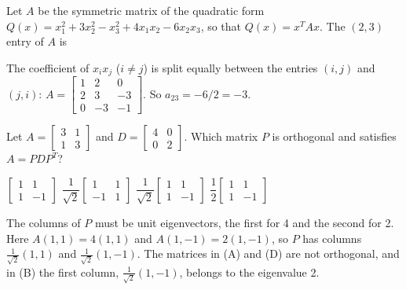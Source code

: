 \begin{question}[id=sym-10]
Let $A$ be the symmetric matrix of the quadratic form $Q(x) = x_1^2 + 3x_2^2 - x_3^2 + 4x_1x_2 - 6x_2x_3$, so that $Q(x) = x^TAx$. The $(2, 3)$ entry of $A$ is
\begin{solution}
The coefficient of $x_ix_j$ ($i \ne j$) is split equally between the entries $(i, j)$ and $(j, i)$: $A = \begin{bmatrix} 1 & 2 & 0 \\ 2 & 3 & -3 \\ 0 & -3 & -1 \end{bmatrix}$. So $a_{23} = -6/2 = -3$.
\end{solution}
\end{question}

\begin{question}[id=sym-11, marks=2]
Let $A = \begin{bmatrix} 3 & 1 \\ 1 & 3 \end{bmatrix}$ and $D = \begin{bmatrix} 4 & 0 \\ 0 & 2 \end{bmatrix}$. Which matrix $P$ is orthogonal and satisfies $A = PDP^T$?
\begin{options}
  \option $\begin{bmatrix} 1 & 1 \\ 1 & -1 \end{bmatrix}$
  \option $\dfrac{1}{\sqrt{2}}\begin{bmatrix} 1 & 1 \\ -1 & 1 \end{bmatrix}$
  \correct $\dfrac{1}{\sqrt{2}}\begin{bmatrix} 1 & 1 \\ 1 & -1 \end{bmatrix}$
  \option $\dfrac{1}{2}\begin{bmatrix} 1 & 1 \\ 1 & -1 \end{bmatrix}$
\end{options}
\begin{solution}
The columns of $P$ must be unit eigenvectors, the first for 4 and the second for 2. Here $A(1, 1) = 4(1, 1)$ and $A(1, -1) = 2(1, -1)$, so $P$ has columns $\frac{1}{\sqrt{2}}(1, 1)$ and $\frac{1}{\sqrt{2}}(1, -1)$. The matrices in (A) and (D) are not orthogonal, and in (B) the first column, $\frac{1}{\sqrt{2}}(1, -1)$, belongs to the eigenvalue 2.
\end{solution}
\end{question}

